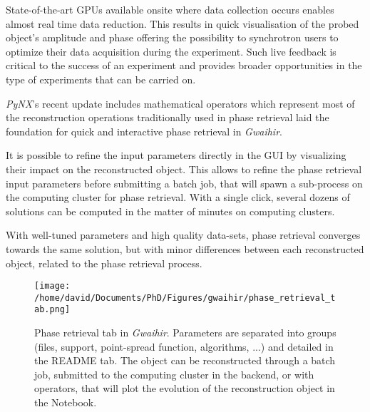 State-of-the-art GPUs available onsite where data collection occurs enables almost real time data reduction.
This results in quick visualisation of the probed object's amplitude and phase offering the possibility to synchrotron users to optimize their data acquisition during the experiment. Such live feedback is critical to the success of an experiment and provides broader opportunities in the type of experiments that can be carried on.


\textit{PyNX}'s recent update includes mathematical operators \cite{pynx2020operators} which represent most of the reconstruction operations traditionally used in phase retrieval \cite{gerchberg_practical_1972,fienup_reconstruction_1978,marchesini_publishers_2007} laid the foundation for quick and interactive phase retrieval in \textit{Gwaihir}.

It is possible to refine the input parameters directly in the GUI by visualizing their impact on the reconstructed object. This allows to refine the phase retrieval input parameters before submitting a batch job, that will spawn a sub-process on the computing cluster for phase retrieval. With a single click, several dozens of solutions can be computed in the matter of minutes on computing clusters.

With well-tuned parameters and high quality data-sets, phase retrieval converges towards the same solution, but with minor differences between each reconstructed object, related to the phase retrieval process.

\begin{figure}[!htb]
    \centering
    \texttt{[image: /home/david/Documents/PhD/Figures/gwaihir/phase\_retrieval\_tab.png]}
    \caption{Phase retrieval tab in \textit{Gwaihir}. Parameters are separated into groups (files, support, point-spread function, algorithms, ...) and detailed in the README tab. The object can be reconstructed through a batch job, submitted to the computing cluster in the backend, or with operators, that will plot the evolution of the reconstruction object in the Notebook.}
    \label{fig:PRT}
\end{figure}


